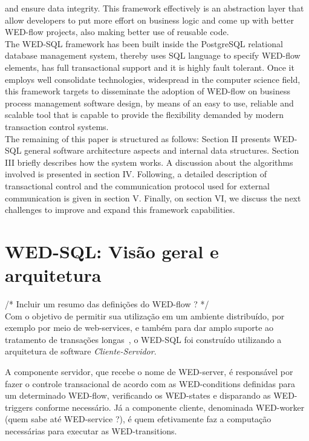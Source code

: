 \documentclass[conference]{IEEEtran}
\begin{document}
and ensure data integrity. This framework effectively is an abstraction layer that allow developers to put more effort
on business logic and come up with better WED-flow projects, also making better use of reusable code. 
\\
\indent The WED-SQL framework has been built inside the PostgreSQL relational database management system, thereby uses SQL language
to specify WED-flow elements, has full transactional support and it is highly fault tolerant. Once it employs well consolidate 
technologies, widespread in the computer science field, this framework targets to disseminate the adoption of WED-flow on
business process management software design, by means of an easy to use, reliable and scalable tool that is capable to 
provide the flexibility demanded by modern transaction control systems. 
\\
\indent The remaining of this paper is structured as follows: Section II presents WED-SQL general software architecture aspects and
internal data structures. Section III briefly describes how the system works. A discussion about the algorithms involved
is presented in section IV. Following, a detailed description of transactional control and the communication protocol used
for external communication is given in section V. Finally, on section VI, we discuss the next challenges to improve and
expand this framework capabilities.  
  

\section{WED-SQL: Visão geral e arquitetura}
/* Incluir um resumo das definições do WED-flow ? */\\
Com o objetivo de permitir sua utilização em um ambiente distribuído, por exemplo por meio de web-services, e também para dar
amplo suporte ao tratamento de transações longas~\cite{MOLINA}, o WED-SQL foi construído utilizando a arquitetura de 
software \emph{Cliente-Servidor}. 

\par A componente servidor, que recebe o nome de WED-server, é responsável por fazer o controle transacional de acordo com 
as WED-conditions definidas para um determinado WED-flow, verificando os WED-states e disparando as WED-triggers conforme 
necessário. Já a componente cliente, denominada WED-worker (quem sabe até WED-service ?), é quem efetivamente faz a computação
necessárias para executar as WED-transitions.
\\
\end{document}

